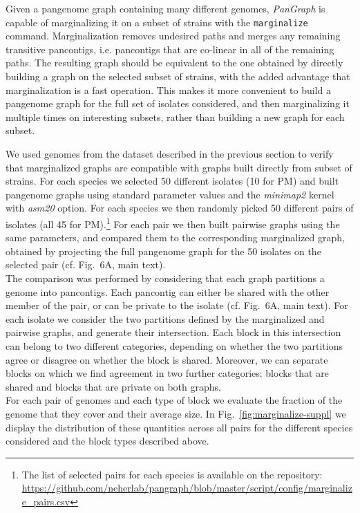 \documentclass[aps,rmp,reprint,superscriptaddress,notitlepage,10pt,onecolumn]{revtex4-1}
\begin{document}
Given a pangenome graph containing many different genomes, \textit{PanGraph} is capable of marginalizing it on a subset of strains with the \verb|marginalize| command. Marginalization removes undesired paths and merges any remaining transitive pancontigs, i.e. pancontigs that are co-linear in all of the remaining paths.
The resulting graph should be equivalent to the one obtained by directly building a graph on the selected subset of strains, with the added advantage that marginalization is a fast operation. This makes it more convenient to build a pangenome graph for the full set of isolates considered, and then marginalizing it multiple times on interesting subsets, rather than building a new graph for each subset.

We used genomes from the dataset described in the previous section to verify that marginalized graphs are compatible with graphs built directly from subset of strains. For each species we selected 50 different isolates (10 for PM) and built pangenome graphs using standard parameter values and the \textit{minimap2} kernel with \textit{asm20} option. For each species we then randomly picked 50 different pairs of isolates (all 45 for PM).\footnote{
    The list of selected pairs for each species is available on the repository: \url{https://github.com/neherlab/pangraph/blob/master/script/config/marginalize_pairs.csv}
}
For each pair we then built pairwise graphs using the same parameters, and compared them to the corresponding marginalized graph, obtained by projecting the full pangenome graph for the 50 isolates on the selected pair (cf. Fig.~6A, main text).\\
The comparison was performed by considering that each graph partitions a genome into pancontigs. Each pancontig can either be shared with the other member of the pair, or can be private to the isolate (cf. Fig.~6A, main text). For each isolate we consider the two partitions defined by the marginalized and pairwise graphs, and generate their intersection. Each block in this intersection can belong to two different categories, depending on whether the two partitions agree or disagree on whether the block is shared. Moreover, we can separate blocks on which we find agreement in two further categories: blocks that are shared and blocks that are private on both graphs.\\
For each pair of genomes and each type of block we evaluate the fraction of the genome that they cover and their average size. In Fig.~\ref{fig:marginalize-suppl} we display the distribution of these quantities across all pairs for the different species considered and the block types described above.\\
\end{document}
